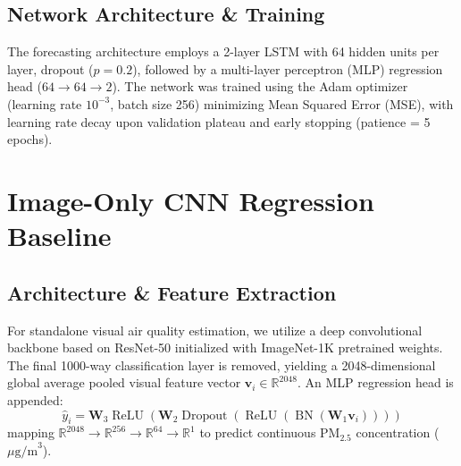 \documentclass[conference]{IEEEtran}
\begin{document}
\subsection{Network Architecture \& Training}
The forecasting architecture employs a 2-layer LSTM with 64 hidden units per layer, dropout ($p=0.2$), followed by a multi-layer perceptron (MLP) regression head ($64 \rightarrow 64 \rightarrow 2$). The network was trained using the Adam optimizer (learning rate $10^{-3}$, batch size 256) minimizing Mean Squared Error (MSE), with learning rate decay upon validation plateau and early stopping (patience = 5 epochs).

\section{Image-Only CNN Regression Baseline}

\subsection{Architecture \& Feature Extraction}
For standalone visual air quality estimation, we utilize a deep convolutional backbone based on ResNet-50 \cite{he2016resnet} initialized with ImageNet-1K pretrained weights. The final 1000-way classification layer is removed, yielding a 2048-dimensional global average pooled visual feature vector $\mathbf{v}_i \in \mathbb{R}^{2048}$. An MLP regression head is appended:
\begin{equation}
\hat{y}_i = \mathbf{W}_3 \operatorname{ReLU}(\mathbf{W}_2 \operatorname{Dropout}(\operatorname{ReLU}(\operatorname{BN}(\mathbf{W}_1 \mathbf{v}_i))))
\end{equation}
mapping $\mathbb{R}^{2048} \rightarrow \mathbb{R}^{256} \rightarrow \mathbb{R}^{64} \rightarrow \mathbb{R}^1$ to predict continuous $\text{PM}_{2.5}$ concentration ($\mu\text{g/m}^3$).
\end{document}
